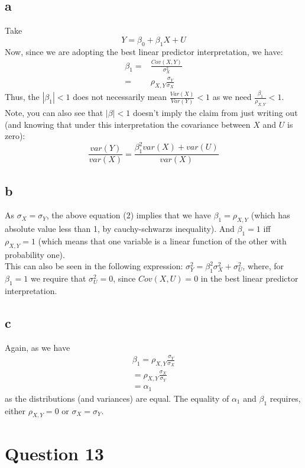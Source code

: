 \documentclass[12pt]{paper}
\begin{document}
\subsection*{a}
Take $$Y = \beta_0 + \beta_1 X + U $$
Now, since we are adopting the best linear predictor interpretation, we have: 
\begin{align}
    \beta_1 =& \frac{Cov(X,Y)}{\sigma^2_X} \\
    =& \rho_{X,Y} \frac{\sigma_Y}{\sigma_X}
\end{align}
Thus, the $|\beta_1|<1$ does not necessarily mean $\frac{Var(X)}{Var(Y)} <1$ as we need $\frac{\beta_1}{\rho_{X,Y}}<1$. Note, you can also see that $|\beta|<1$ doesn't imply the claim from just writing out (and knowing that under this interpretation the covariance between $X$ and $U$ is zero):
$$\frac{var(Y)}{var(X)} = \frac{\beta_1^2 var(X) + var(U)}{var(X)}$$


\subsection*{b}
As $\sigma_X = \sigma_Y$, the above equation (2) implies that we have $\beta_1 = \rho_{X,Y}$ (which has absolute value less than 1, by cauchy-schwarzs inequality). And $\beta_1 = 1$ iff $\rho_{X,Y}=1$ (which means that one variable is a linear function of the other with probability one). \\ 

This can also be seen in the following expression: $\sigma^2_Y = \beta_1^2 \sigma^2_X + \sigma^2_U$, where, for $\beta_1 = 1$ we require that $\sigma^2_U=0$, since $Cov(X,U)=0$ in the best linear predictor interpretation.

\subsection*{c}
Again, as we have 
\begin{align*}
    \beta_1  = \rho_{X,Y} \frac{\sigma_Y}{\sigma_X} \\
    = \rho_{X,Y}\frac{\sigma_X}{\sigma_Y} \\
    = \alpha_1
\end{align*}
as the distributions (and variances) are equal. The equality of $\alpha_1$ and $\beta_1$ requires, either $\rho_{X,Y} = 0$ or $\sigma_X = \sigma_Y$.

\section*{Question 13}
\end{document}
